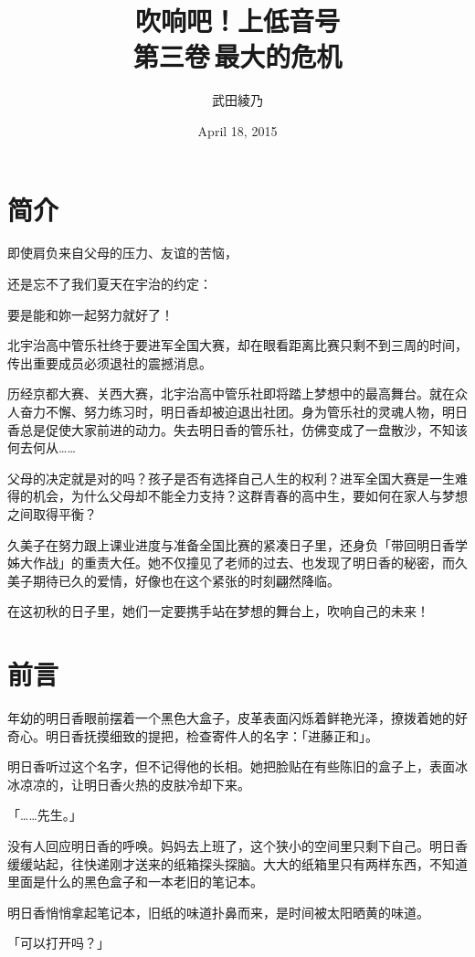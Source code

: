 \documentclass[UTF8]{ctexart}
\title{吹响吧！上低音号\\ \Large{第三卷\,最大的危机}}
\date{April 18, 2015}
\author{武田綾乃}
\begin{document}
    \maketitle
    \section*{简介}
    即使肩负来自父母的压力、友谊的苦恼，

    还是忘不了我们夏天在宇治的约定：

    要是能和妳一起努力就好了！

    北宇治高中管乐社终于要进军全国大赛，却在眼看距离比赛只剩不到三周的时间，传出重要成员必须退社的震撼消息。

    历经京都大赛、关西大赛，北宇治高中管乐社即将踏上梦想中的最高舞台。就在众人奋力不懈、努力练习时，明日香却被迫退出社团。身为管乐社的灵魂人物，明日香总是促使大家前进的动力。失去明日香的管乐社，仿佛变成了一盘散沙，不知该何去何从……

    父母的决定就是对的吗？孩子是否有选择自己人生的权利？进军全国大赛是一生难得的机会，为什么父母却不能全力支持？这群青春的高中生，要如何在家人与梦想之间取得平衡？

    久美子在努力跟上课业进度与准备全国比赛的紧凑日子里，还身负「带回明日香学姊大作战」的重责大任。她不仅撞见了老师的过去、也发现了明日香的秘密，而久美子期待已久的爱情，好像也在这个紧张的时刻翩然降临。

    在这初秋的日子里，她们一定要携手站在梦想的舞台上，吹响自己的未来！ 

    \tableofcontents
    \setcounter{secnumdepth}{-2}
    \section{前言}
    年幼的明日香眼前摆着一个黑色大盒子，皮革表面闪烁着鲜艳光泽，撩拨着她的好奇心。明日香抚摸细致的提把，检查寄件人的名字：「进藤正和」。 

    明日香听过这个名字，但不记得他的长相。她把脸贴在有些陈旧的盒子上，表面冰冰凉凉的，让明日香火热的皮肤冷却下来。 

    「……先生。」 

    没有人回应明日香的呼唤。妈妈去上班了，这个狭小的空间里只剩下自己。明日香缓缓站起，往快递刚才送来的纸箱探头探脑。大大的纸箱里只有两样东西，不知道里面是什么的黑色盒子和一本老旧的笔记本。 

    明日香悄悄拿起笔记本，旧纸的味道扑鼻而来，是时间被太阳晒黄的味道。 

    「可以打开吗？」 
\end{document}
